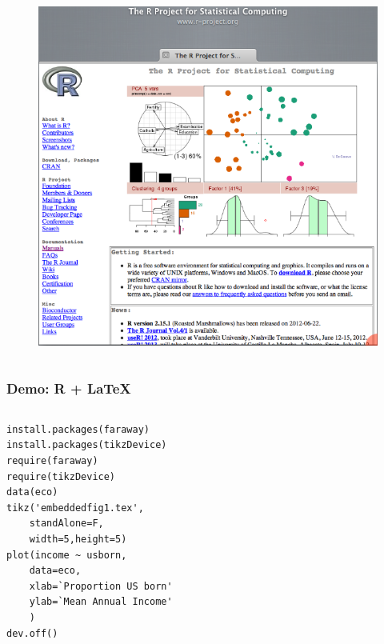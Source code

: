 \begin{frame}[fragile]
\begin{columns}
\begin{column}{0.5\textwidth}
\begin{figure}
{                        \includegraphics[width=\textwidth]{images/Rproject}}
            \end{figure}
        \end{column}
    \end{columns} 
\end{frame}

\begin{frame}[fragile]
    \frametitle{Demo: R + \LaTeX}
    \begin{columns}
        \begin{column}{0.45\textwidth}
    \begin{lstlisting}
install.packages(faraway)
install.packages(tikzDevice)
require(faraway)
require(tikzDevice)
data(eco)
tikz('embeddedfig1.tex', 
    standAlone=F, 
    width=5,height=5)
plot(income ~ usborn, 
    data=eco,
    xlab=`Proportion US born'
    ylab=`Mean Annual Income'
    )
dev.off()
    \end{lstlisting}
        \end{column}
        \begin{column}{0.55\textwidth}
        \begin{figure}[0.8\textwidth]
            
        \end{figure}
        \end{column}
    \end{columns} 
\end{frame}

